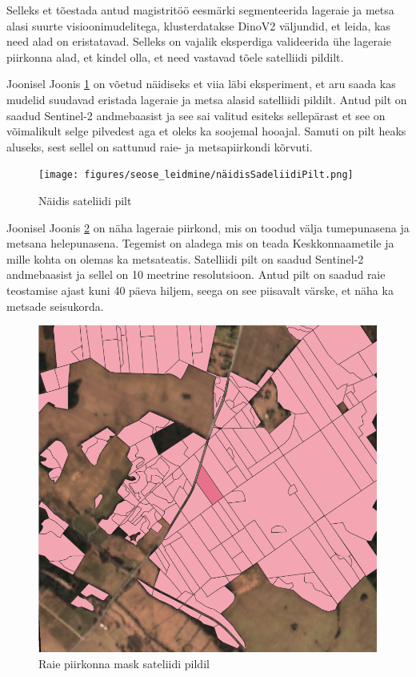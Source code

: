 Selleks et tõestada antud magistritöö eesmärki segmenteerida lageraie ja metsa alasi suurte visioonimudelitega, klusterdatakse DinoV2 väljundid, et leida, kas need alad on eristatavad. Selleks on vajalik eksperdiga valideerida ühe lageraie piirkonna alad, et kindel olla, et need vastavad tõele satelliidi pildilt.

Joonisel Joonis \ref{fig:näidisSadeliidiPilt} on võetud näidiseks et viia läbi eksperiment, et aru saada kas mudelid suudavad eristada lageraie ja metsa alasid satelliidi pildilt. Antud pilt on saadud Sentinel-2 andmebaasist  ja see sai valitud esiteks sellepärast et see on võimalikult selge pilvedest aga et oleks ka soojemal hooajal. Samuti on pilt heaks aluseks, sest sellel on sattunud raie- ja metsapiirkondi kõrvuti.

\begin{figure}[H]
    \centering
    \texttt{[image: figures/seose\_leidmine/näidisSadeliidiPilt.png]}
    \caption{Näidis sateliidi pilt}
    \label{fig:näidisSadeliidiPilt}
\end{figure}

Joonisel Joonis \ref{fig:raieInfoMask} on näha lageraie piirkond, mis on toodud välja tumepunasena ja metsana helepunasena. Tegemist on aladega mis on teada Keskkonnaametile ja mille kohta on olemas ka metsateatis. Satelliidi pilt on saadud Sentinel-2 andmebaasist ja sellel on 10 meetrine resolutsioon. Antud pilt on saadud raie teostamise ajast kuni 40 päeva hiljem, seega on see piisavalt värske, et näha ka metsade seisukorda.

\begin{figure}[H]
    \centering
    \includegraphics[width=.7\textwidth]{figures/seose_leidmine/raieInfoMask.png}
    \caption{Raie piirkonna mask sateliidi pildil}
    \label{fig:raieInfoMask}
\end{figure}

